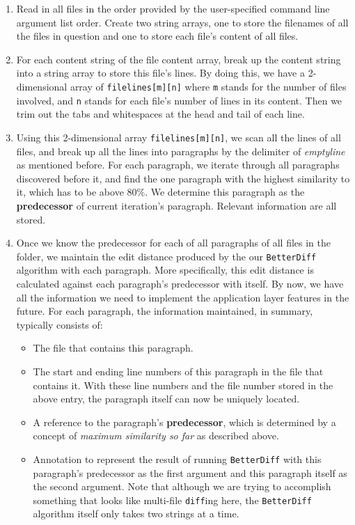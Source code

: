 \documentclass{article}
\begin{document}
\begin{enumerate}
  \item Read in all files in the order provided by the user-specified command line argument list order. Create two string arrays, one to store the filenames of all the files in question and one to store each file's content of all files. 
  \item For each content string of the file content array, break up the content string into a string array to store this file's lines. By doing this, we have a 2-dimensional array of \texttt{filelines[m][n]} where \texttt{m} stands for the number of files involved, and \texttt{n} stands for each file's number of lines in its content. Then we trim out the tabs and whitespaces at the head and tail of each line. 
  \item Using this 2-dimensional array \texttt{filelines[m][n]}, we scan all the lines of all files, and break up all the lines into paragraphs by the delimiter of \textit{emptyline} as mentioned before. For each paragraph, we iterate through all paragraphs discovered before it, and find the one paragraph with the highest similarity to it, which has to be above 80\%. We determine this paragraph as the \textbf{predecessor} of current iteration's paragraph. Relevant information are all stored.
  \item Once we know the predecessor for each of all paragraphs of all files in the folder, we maintain the edit distance produced by the our \texttt{BetterDiff} algorithm with each paragraph. More specifically, this edit distance is calculated against each paragraph's predecessor with itself. By now, we have all the information we need to implement the application layer features in the future. For each paragraph, the information maintained, in summary, typically consists of:
  \begin{itemize}
    \item The file that contains this paragraph.
    \item The start and ending line numbers of this paragraph in the file that contains it. With these line numbers and the file number stored in the above entry, the paragraph itself can now be uniquely located.
    \item A reference to the paragraph's \textbf{predecessor}, which is determined by a concept of \textit{maximum similarity so far} as described above.
    \item Annotation to represent the result of running \texttt{BetterDiff} with this paragraph's predecessor as the first argument and this paragraph itself as the second argument. Note that although we are trying to accomplish something that looks like multi-file \texttt{diff}ing here, the \texttt{BetterDiff} algorithm itself only takes two strings at a time. 


\end{itemize}
\end{enumerate}
\end{document}

